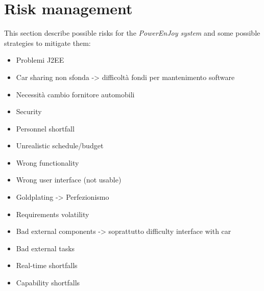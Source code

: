 \section{Risk management}\label{sec:riskManagement}
This section describe possible risks for the \emph{PowerEnJoy system} and some possible strategies to mitigate them:
\begin{itemize}
\item Problemi J2EE
\item Car sharing non sfonda -> difficoltà fondi per mantenimento software
\item Necessità cambio fornitore automobili
\item Security
\item Personnel shortfall
\item Unrealistic schedule/budget
\item Wrong functionality
\item Wrong user interface (not usable)
\item Goldplating -> Perfezionismo
\item Requirements volatility
\item Bad external components -> soprattutto difficulty interface with car
\item Bad external tasks
\item Real-time shortfalls
\item Capability shortfalls
\end{itemize}

